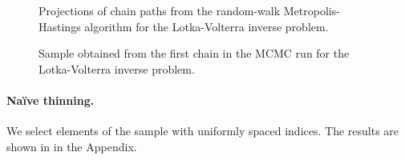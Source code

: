 \documentclass[11pt,a4paper]{report}
\begin{document}
\begin{figure}[t]
\centering
{}
\caption{Projections of chain paths from the random-walk Metropolis-Hastings algorithm for the Lotka-Volterra inverse problem.
\label{fig:lotka-volterra:chain-paths}}
\end{figure}

\begin{figure}[t]
\centering
{}
\caption{Sample obtained from the first chain in the MCMC run for the Lotka-Volterra inverse problem.
\label{fig:lotka-volterra:chain1-sample}}
\end{figure}

\paragraph{Na\"ive thinning.} We select elements of the sample with uniformly spaced indices. The results are shown in  in the Appendix.
\end{document}
